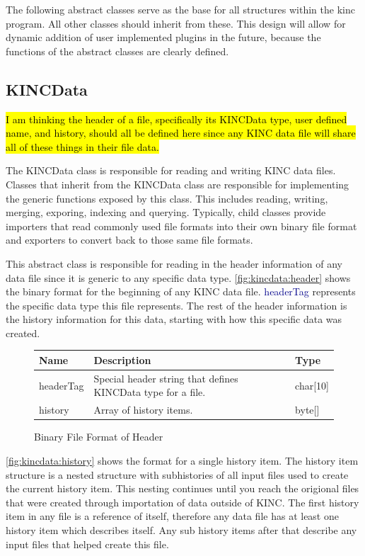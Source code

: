 \documentclass[10pt]{article}
\providecommand{\btable}[3]
{
\begin{figure}[H]
\begin{mdframed}[hidealllines=true,backgroundcolor=btablecol]
\begin{tabularx}{\textwidth}{|l|X|l|}
\hline
\textbf{Name} & \textbf{Description} & \textbf{Type} \\
\hline
#3
\hline
\end{tabularx}
\end{mdframed}
\caption{#1}
\label{#2}
\end{figure}
}
\providecommand{\josh}[1]{\sethlcolor{lblue}\hl{#1}}
\providecommand{\h}[1]{\textcolor{darkblue}{#1}}
\begin{document}
The following abstract classes serve as the base for all structures within the 
kinc program.  All other classes should inherit from these. This design will 
allow for dynamic addition of user implemented plugins in the future, because
the functions of the abstract classes are clearly defined.

\subsection{KINCData}

\josh{I am thinking the header of a file, specifically its KINCData type, user 
defined name, and history, should all be defined here since any KINC data file 
will share all of these things in their file data.}

The KINCData class is responsible for reading and writing KINC data files.  
Classes that inherit from the KINCData class are responsible for implementing 
the generic functions exposed by this class.  This includes reading, writing, 
merging, exporing, indexing and querying. Typically, child classes provide 
importers that read commonly used file formats into their own binary file 
format and exporters to convert back to those same file formats.

This abstract class is responsible for reading in the header information of any 
data file since it is generic to any specific data type. 
\autoref{fig:kincdata:header} shows the binary format for the beginning of any 
KINC data file. \h{headerTag} represents the specific data type this file 
represents. The rest of the header information is the history information for 
this data, starting with how this specific data was created.

\btable{Binary File Format of Header}{fig:kincdata:header}{
headerTag & Special header string that defines KINCData type for a file. & 
char[10] \\
\hline
history & Array of history items. & byte[] \\
}

\autoref{fig:kincdata:history} shows the format for a single history item. The 
history item structure is a nested structure with subhistories of all input 
files used to create the current history item. This nesting continues until you 
reach the origional files that were created through importation of data outside 
of KINC. The first history item in any file is a reference of itself, therefore 
any data file has at least one history item which describes itself. Any sub 
history items after that describe any input files that helped create this file.
\end{document}
